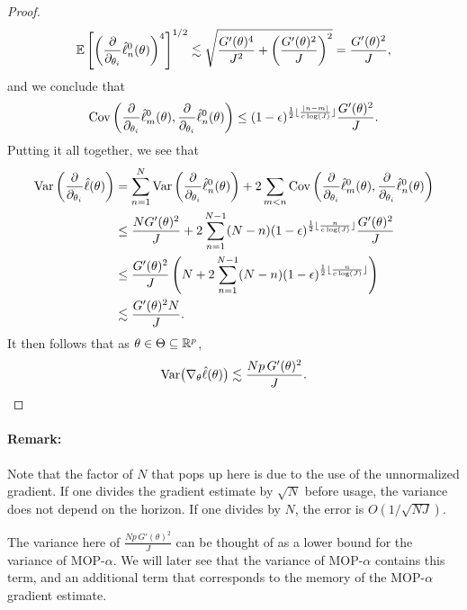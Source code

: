 \begin{proof}
\begin{equation}
\mathbb{E}\left[\left(\frac{\partial}{\partial_{\theta_i}}\hat\ell_n^0(\theta)\right)^4\right]^{1/2} \lesssim  \sqrt{\frac{G'(\theta)^4}{J^2}+\left(\frac{G'(\theta)^2}{J}\right)^2} = \frac{G'(\theta)^2}{J},
\end{equation}
and we conclude that 
\begin{equation}
\mathrm{Cov}\left(\frac{\partial}{\partial_{\theta_i}}\hat\ell_m^0(\theta), \frac{\partial}{\partial_{\theta_i}}\hat\ell_n^0(\theta)\right) \leq (1-\epsilon)^{\frac{1}{2}\lfloor \frac{|n-m|}{c\log(J)} \rfloor}\frac{G'(\theta)^2}{J}.
\end{equation}
Putting it all together, we see that
\begin{align}
    \mathrm{Var}\left(\frac{\partial}{\partial_{\theta_i}} \hat\ell(\theta)\right) &= \sum_{n=1}^N \mathrm{Var}\left(\frac{\partial}{\partial_{\theta_i}}\hat\ell_n^0(\theta)\right) + 2\sum_{m<n} \mathrm{Cov}\left(\frac{\partial}{\partial_{\theta_i}}\hat\ell_m^0(\theta),\frac{\partial}{\partial_{\theta_i}}\hat\ell_n^0(\theta)\right)\\
    &\leq \frac{NG'(\theta)^2}{J} + 2\sum_{n=1}^{N-1} (N-n)(1-\epsilon)^{\frac{1}{2}\lfloor \frac{n}{c\log(J)} \rfloor}\frac{G'(\theta)^2}{J} \\
    &\leq \frac{G'(\theta)^2}{J} \left(N + 2\sum_{n=1}^{N-1} (N-n) (1-\epsilon)^{\frac{1}{2}\lfloor \frac{n}{c\log(J)} \rfloor}\right) \\
    &\lesssim \frac{G'(\theta)^2N}{J}.
\end{align}
It then follows that as $\theta \in \Theta \subseteq \mathbb{R}^p$, 
\begin{equation}
    \mathrm{Var}\big(\nabla_{\theta} \hat\ell(\theta)\big) \lesssim \frac{Np \, G'(\theta)^2}{J}.
\end{equation}
\end{proof}


\paragraph{Remark:} Note that the factor of $N$ that pops up here is due to the use of the unnormalized gradient. If one divides the gradient estimate by $\sqrt{N}$ before usage, the variance does not depend on the horizon. If one divides by $N$, the error is $O(1/\sqrt{NJ})$.

The variance here of $\frac{Np \, G'(\theta)^2}{J}$ can be thought of as a lower bound for the variance of MOP-$\alpha$. We will later see that the variance of MOP-$\alpha$ contains this term, and an additional term that corresponds to the memory of the MOP-$\alpha$ gradient estimate.

